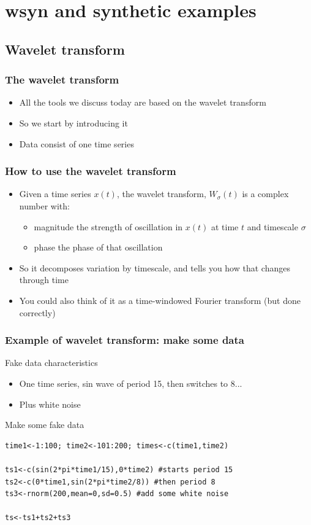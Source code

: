 \documentclass{beamer}
\begin{document}
\section{wsyn and synthetic examples}

\subsection{Wavelet transform}

{
\begin{frame}
\frametitle{The wavelet transform}
\begin{itemize}
\item All the tools we discuss today are based on the wavelet transform
\item So we start by introducing it
\item Data consist of one time series
\end{itemize}
\end{frame}}

\begin{frame}
\frametitle{How to use the wavelet transform}
\begin{itemize}
\item Given a time series $x(t)$, the wavelet transform, $W_{\sigma}(t)$ is a complex number with:
\begin{itemize}
\item magnitude the strength of oscillation in $x(t)$ at time $t$ and timescale $\sigma$
\item phase the phase of that oscillation
\end{itemize}
\item So it decomposes variation by timescale, and tells you how that changes through time
\item You could also think of it as a time-windowed Fourier transform (but done correctly)
\end{itemize}
\end{frame}

\begin{frame}[fragile]
\frametitle{Example of wavelet transform: make some data}
\begin{block}{Fake data characteristics}
\begin{itemize}
\item One time series, sin wave of period 15, then switches to 8...
\item Plus white noise
\end{itemize}
\end{block}
\begin{exampleblock}{Make some fake data}
\begin{verbatim}
time1<-1:100; time2<-101:200; times<-c(time1,time2)

ts1<-c(sin(2*pi*time1/15),0*time2) #starts period 15
ts2<-c(0*time1,sin(2*pi*time2/8)) #then period 8
ts3<-rnorm(200,mean=0,sd=0.5) #add some white noise

ts<-ts1+ts2+ts3 
\end{verbatim}
\end{exampleblock}
\end{frame}
\end{document}
